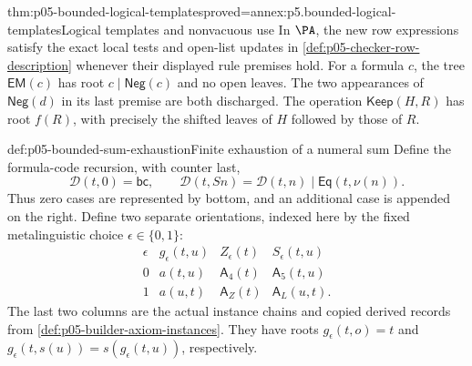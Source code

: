 \begin{hblemma}{thm:p05-bounded-logical-templates}{proved=annex:p5.bounded-logical-templates}{Logical templates and nonvacuous use}
In \(\PA\), the new row expressions satisfy the exact local tests and
open-list updates in \cref{def:p05-checker-row-description} whenever their
displayed rule premises hold. For a formula \(c\), the tree
\(\mathsf{EM}(c)\) has root \(c\mathbin{|}\mathsf{Neg}(c)\) and no
open leaves. The two appearances of \(\mathsf{Neg}(d)\) in its last
premise are both discharged. The operation \(\mathsf{Keep}(H,R)\)
has root \(f(R)\), with precisely the shifted leaves of \(H\) followed
by those of \(R\).
\end{hblemma}

\begin{hbdefinition}{def:p05-bounded-sum-exhaustion}{Finite exhaustion of a numeral sum}
Define the formula-code recursion, with counter last,
\[
 \mathcal D(t,0)=\mathsf{bc},\qquad
 \mathcal D(t,Sn)=\mathcal D(t,n)\mathbin{|}\mathsf{Eq}(t,\nu(n)).
\]
Thus zero cases are represented by bottom, and an additional case is appended
on the right. Define two separate orientations, indexed here by the fixed
metalinguistic choice \(\epsilon\in\{0,1\}\):
\[
\begin{array}{c|c|c|c}
 \epsilon&g_\epsilon(t,u)&Z_\epsilon(t)&S_\epsilon(t,u)\\\hline
 0&a(t,u)&\mathsf A_4(t)&\mathsf A_5(t,u)\\
 1&a(u,t)&\mathsf A_Z(t)&\mathsf A_L(u,t).
\end{array}
\]
The last two columns are the actual instance chains and copied derived
records from \cref{def:p05-builder-axiom-instances}. They have roots
\(g_\epsilon(t,o)=t\) and
\(g_\epsilon(t,s(u))=s(g_\epsilon(t,u))\), respectively.


\end{hbdefinition}

